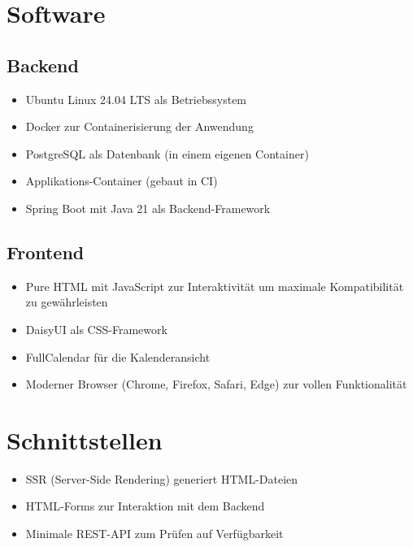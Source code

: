 \section{Software}

\subsection{Backend}

\begin{itemize}
    \item Ubuntu Linux 24.04 LTS als Betriebssystem
    \item Docker zur Containerisierung der Anwendung
    \item PostgreSQL als Datenbank (in einem eigenen Container)
    \item Applikations-Container (gebaut in CI)
    \item Spring Boot mit Java 21 als Backend-Framework
\end{itemize}

\subsection{Frontend}

\begin{itemize}
    \item Pure HTML mit JavaScript zur Interaktivität um maximale Kompatibilität zu gewährleisten
    \item DaisyUI als CSS-Framework
    \item FullCalendar für die Kalenderansicht
    \item Moderner Browser (Chrome, Firefox, Safari, Edge) zur vollen Funktionalität
\end{itemize}

\section{Schnittstellen}

\begin{itemize}
    \item SSR (Server-Side Rendering) generiert HTML-Dateien
    \item HTML-Forms zur Interaktion mit dem Backend
    \item Minimale REST-API zum Prüfen auf Verfügbarkeit
\end{itemize}